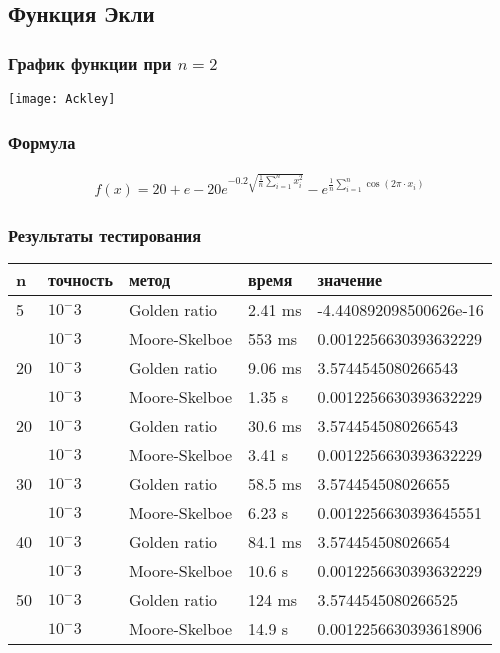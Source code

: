     \subsection*{Функция Экли}

    \subsubsection*{График функции при $n=2$}
    \texttt{[image: Ackley]}

    \subsubsection*{Формула}
    \begin{gather*}
        f(x)=20+e-20 e^{-0.2 \sqrt{\frac{1}{n} \sum_{i=1}^n x_i^2}}-e^{\frac{1}{n} \sum_{i=1}^n \cos \left(2 \pi \cdot x_i\right)}
    \end{gather*}

    \subsubsection*{Результаты тестирования}

    \begin{tabular}{ |p{2cm}|p{2cm}|p{3cm}|p{2cm}|p{4cm}|  }
        \hline
        n  & точность & метод         & время   & значение               \\
        \hline
        5  & $10^-3$  & Golden ratio  & 2.41 ms & -4.440892098500626e-16 \\\cline{2-5}
        & $10^-3$  & Moore-Skelboe & 553 ms  & 0.0012256630393632229  \\
        \hline
        20 & $10^-3$  & Golden ratio  & 9.06 ms & 3.5744545080266543     \\\cline{2-5}
        & $10^-3$  & Moore-Skelboe & 1.35 s  & 0.0012256630393632229  \\
        \hline
        20 & $10^-3$  & Golden ratio  & 30.6 ms & 3.5744545080266543     \\\cline{2-5}
        & $10^-3$  & Moore-Skelboe & 3.41 s  & 0.0012256630393632229  \\
        \hline
        30 & $10^-3$  & Golden ratio  & 58.5 ms & 3.574454508026655      \\\cline{2-5}
        & $10^-3$  & Moore-Skelboe & 6.23 s  & 0.0012256630393645551  \\
        \hline
        40 & $10^-3$  & Golden ratio  & 84.1 ms & 3.574454508026654      \\\cline{2-5}
        & $10^-3$  & Moore-Skelboe & 10.6 s  & 0.0012256630393632229  \\
        \hline
        50 & $10^-3$  & Golden ratio  & 124 ms  & 3.5744545080266525     \\\cline{2-5}
        & $10^-3$  & Moore-Skelboe & 14.9 s  & 0.0012256630393618906  \\
        \hline

    \end{tabular}

